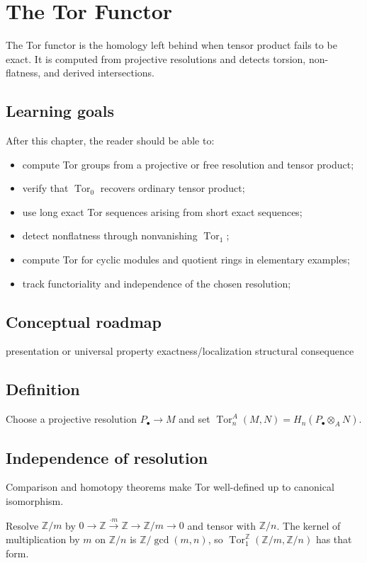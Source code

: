 \chapter{The Tor Functor}
\label{ch:v26}

The Tor functor is the homology left behind when tensor product fails to be exact. It is computed from projective resolutions and detects torsion, non-flatness, and derived intersections.

\section*{Learning goals}
After this chapter, the reader should be able to:
\begin{itemize}
\item compute Tor groups from a projective or free resolution and tensor product;
\item verify that \(\operatorname{Tor}_0\) recovers ordinary tensor product;
\item use long exact Tor sequences arising from short exact sequences;
\item detect nonflatness through nonvanishing \(\operatorname{Tor}_1\);
\item compute Tor for cyclic modules and quotient rings in elementary examples;
\item track functoriality and independence of the chosen resolution;
\end{itemize}
\section*{Conceptual roadmap}
\volroadmap
  {presentation or universal property}
  {exactness/localization}
  {structural consequence}

\section{Definition}
Choose a projective resolution $P_\bullet\to M$ and set $\operatorname{Tor}_n^A(M,N)=H_n(P_\bullet\otimes_A N)$.

\section{Independence of resolution}
Comparison and homotopy theorems make Tor well-defined up to canonical isomorphism.

\begin{example}\label{ex:v26-expand-01}
Resolve $\mathbb Z/m$ by $0\to\mathbb Z\xrightarrow{\cdot m}\mathbb Z\to\mathbb Z/m\to0$ and tensor with $\mathbb Z/n$. The kernel of multiplication by $m$ on $\mathbb Z/n$ is $\mathbb Z/\gcd(m,n)$, so $\operatorname{Tor}_1^{\mathbb Z}(\mathbb Z/m,\mathbb Z/n)$ has that form.
\end{example}
